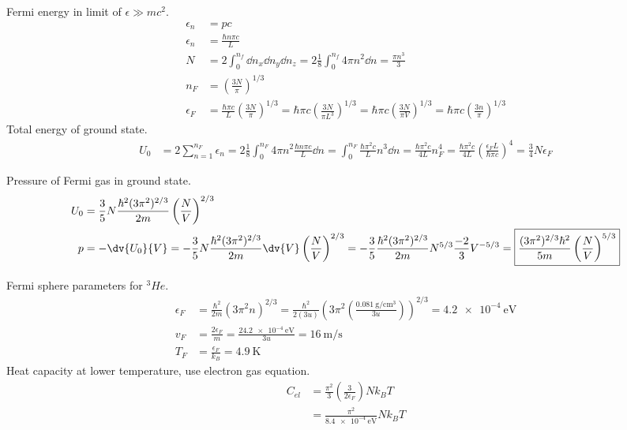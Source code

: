 \documentclass[newpage]{homework}
\begin{document}
\question
Fermi energy in limit of $\epsilon \gg mc^2$.
\begin{align*}
    \epsilon_n    &=  pc  \\
    \epsilon_n   &=  \frac{\hbar n \pi c}{L}  \\
    N   &=  2 \int_{0}^{n_f} \dd{n_x} \dd{n_y} \dd{n_z} = 2 \frac{1}{8} \int_{0}^{n_f} 4\pi n^2 \dd{n} = \frac{\pi n^3}{3} \\
    n_F &=  \left(\frac{3N}{\pi}\right)^{1/3}   \\
    \epsilon_F  &=  \frac{\hbar \pi c}{L} \left(\frac{3N}{\pi}\right)^{1/3}
    =  \hbar \pi c \left(\frac{3N}{\pi L^3}\right)^{1/3}
    =  \hbar \pi c \left(\frac{3N}{\pi V}\right)^{1/3}
    =  \boxed{\hbar \pi c \left(\frac{3n}{\pi}\right)^{1/3}}
\end{align*}
Total energy of ground state.
\begin{align*}
    U_0	&=	2 \sum_{n=1}^{n_F} \epsilon_n
    = 2 \frac{1}{8} \int_{0}^{n_F} 4\pi n^2 \frac{\hbar n \pi c}{L} \dd{n}
    = \int_{0}^{n_F} \frac{\hbar \pi^2 c}{L} n^3 \dd{n}
    = \frac{\hbar \pi^2 c}{4L} n_F^4
    = \frac{\hbar \pi^2 c}{4L} \left(\frac{\epsilon_F L}{\hbar \pi c}\right)^4
    = \boxed{\frac{3}{4} N \epsilon_F}
\end{align*}


\question
Pressure of Fermi gas in ground state.
\begin{align*}
    U_0	&=	\frac{3}{5} N \frac{\hbar^2 (3 \pi^2)^{2/3}}{2m} \left(\frac{N}{V}\right)^{2/3}	\\
    p   &=  -\dv{U_0}{V}
    =   - \frac{3}{5} N \frac{\hbar^2 (3 \pi^2)^{2/3}}{2m} \dv{V} \left(\frac{N}{V}\right)^{2/3}
    =   - \frac{3}{5} \frac{\hbar^2 (3 \pi^2)^{2/3}}{2m} N^{5/3} \frac{-2}{3} V^{-5/3}
    =   \boxed{\frac{(3 \pi^2)^{2/3} \hbar^2}{5m} \left(\frac{N}{V}\right)^{5/3}}
\end{align*}


\question
Fermi sphere parameters for $^3 He$.
\begin{align*}
    \epsilon_F    &= \frac{\hbar^2}{2m} (3\pi^2 n)^{2/3}
    = \frac{\hbar^2}{2(3 u)} \left(3\pi^2 \left(\frac{\SI{0.081}{\gram/\centi\metre^3}}{3 u}\right)\right)^{2/3}
    = \boxed{\SI{4.2e-4}{\electronvolt}} \\
    v_F &=  \frac{2 \epsilon_F}{m}
    = \frac{2 \SI{4.2e-4}{\electronvolt}}{3 u} 
    = \boxed{\SI{16}{\metre/\second}} \\
    T_F &=  \frac{\epsilon_F}{k_B}
    = \boxed{\SI{4.9}{\kelvin}}
\end{align*}
Heat capacity at lower temperature, use electron gas equation.
\begin{align*}
    C_{el}	&=	\frac{\pi^2}{3}(\frac{3}{2\epsilon_F}) N k_B T  \\
            &=	\frac{\pi^2}{\SI{8.4e-4}{\electronvolt}} N k_B T
\end{align*}
\end{document}
